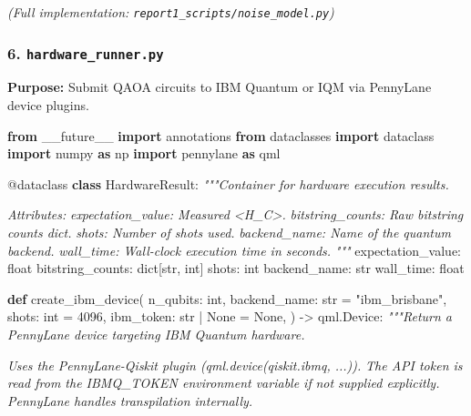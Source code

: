 \documentclass[
  11pt,
]{report}
\newenvironment{Shaded}{}{}
\newcommand{\AttributeTok}[1]{\textcolor[rgb]{0.49,0.56,0.16}{#1}}
\newcommand{\BuiltInTok}[1]{\textcolor[rgb]{0.00,0.50,0.00}{#1}}
\newcommand{\CommentTok}[1]{\textcolor[rgb]{0.38,0.63,0.69}{\textit{#1}}}
\newcommand{\DecValTok}[1]{\textcolor[rgb]{0.25,0.63,0.44}{#1}}
\newcommand{\ImportTok}[1]{\textcolor[rgb]{0.00,0.50,0.00}{\textbf{#1}}}
\newcommand{\KeywordTok}[1]{\textcolor[rgb]{0.00,0.44,0.13}{\textbf{#1}}}
\newcommand{\NormalTok}[1]{#1}
\newcommand{\OperatorTok}[1]{\textcolor[rgb]{0.40,0.40,0.40}{#1}}
\newcommand{\StringTok}[1]{\textcolor[rgb]{0.25,0.44,0.63}{#1}}
\newcommand{\VariableTok}[1]{\textcolor[rgb]{0.10,0.09,0.49}{#1}}
\begin{document}
\emph{(Full implementation: \texttt{report1\_scripts/noise\_model.py})}

\subsubsection{\texorpdfstring{6.
\texttt{hardware\_runner.py}}{6. hardware\_runner.py}}\label{hardware_runner.py}

\textbf{Purpose:} Submit QAOA circuits to IBM Quantum or IQM via
PennyLane device plugins.

\begin{Shaded}
\begin{Highlighting}[]
\ImportTok{from}\NormalTok{ \_\_future\_\_ }\ImportTok{import}\NormalTok{ annotations}
\ImportTok{from}\NormalTok{ dataclasses }\ImportTok{import}\NormalTok{ dataclass}
\ImportTok{import}\NormalTok{ numpy }\ImportTok{as}\NormalTok{ np}
\ImportTok{import}\NormalTok{ pennylane }\ImportTok{as}\NormalTok{ qml}


\AttributeTok{@dataclass}
\KeywordTok{class}\NormalTok{ HardwareResult:}
    \CommentTok{"""Container for hardware execution results.}

\CommentTok{    Attributes:}
\CommentTok{        expectation\_value: Measured \textless{}H\_C\textgreater{}.}
\CommentTok{        bitstring\_counts: Raw bitstring counts dict.}
\CommentTok{        shots: Number of shots used.}
\CommentTok{        backend\_name: Name of the quantum backend.}
\CommentTok{        wall\_time: Wall{-}clock execution time in seconds.}
\CommentTok{    """}
\NormalTok{    expectation\_value: }\BuiltInTok{float}
\NormalTok{    bitstring\_counts: }\BuiltInTok{dict}\NormalTok{[}\BuiltInTok{str}\NormalTok{, }\BuiltInTok{int}\NormalTok{]}
\NormalTok{    shots: }\BuiltInTok{int}
\NormalTok{    backend\_name: }\BuiltInTok{str}
\NormalTok{    wall\_time: }\BuiltInTok{float}


\KeywordTok{def}\NormalTok{ create\_ibm\_device(}
\NormalTok{    n\_qubits: }\BuiltInTok{int}\NormalTok{,}
\NormalTok{    backend\_name: }\BuiltInTok{str} \OperatorTok{=} \StringTok{"ibm\_brisbane"}\NormalTok{,}
\NormalTok{    shots: }\BuiltInTok{int} \OperatorTok{=} \DecValTok{4096}\NormalTok{,}
\NormalTok{    ibm\_token: }\BuiltInTok{str} \OperatorTok{|} \VariableTok{None} \OperatorTok{=} \VariableTok{None}\NormalTok{,}
\NormalTok{) }\OperatorTok{{-}\textgreater{}}\NormalTok{ qml.Device:}
    \CommentTok{"""Return a PennyLane device targeting IBM Quantum hardware.}

\CommentTok{    Uses the PennyLane{-}Qiskit plugin (qml.device(\textquotesingle{}qiskit.ibmq\textquotesingle{}, ...)).}
\CommentTok{    The API token is read from the IBMQ\_TOKEN environment variable if}
\CommentTok{    not supplied explicitly. PennyLane handles transpilation internally.}


\end{Highlighting}
\end{Shaded}
\end{document}
